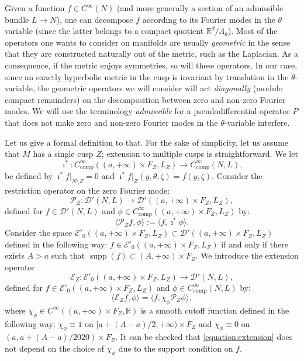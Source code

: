\documentclass[10pt]{amsart}
\newcommand{\R}{\mathbb{R}}
\newcommand{\mc}{\mathcal}
\DeclareMathOperator{\supp}{supp}
\theoremstyle{plain}
\theoremstyle{definition}
\begin{document}
\label{ssection:admissible}

Given a function $f \in C^\infty(N)$ (and more generally a section of an admissible bundle $L \to N$), one can decompose $f$ according to its Fourier modes in the $\theta$ variable (since the latter belongs to a compact quotient $\R^d/\Lambda_\theta$). Most of the operators one wants to consider on manifolds are usually \emph{geometric} in the sense that they are constructed naturally out of the metric, such as the Laplacian. As a consequence, if the metric enjoys symmetries, so will these operators. In our case, since an exactly hyperbolic metric in the cusp is invariant by translation in the $\theta$-variable, the geometric operators we will consider will act \emph{diagonally} (modulo compact remainders) on the decomposition between zero and non-zero Fourier modes. We will use the terminology \emph{admissible} for a pseudodifferential operator $P$ that does not make zero and non-zero Fourier modes in the $\theta$-variable interfere.

Let us give a formal definition to that. For the sake of simplicity, let us assume that $M$ has a single cusp $Z$; extension to multiple cusps is straightforward. We let
\[
\imath^* : C^\infty_{\mathrm{comp}}((a,+\infty) \times F_Z, L_Z) \to C^\infty_{\mathrm{comp}}(N,L),
\]
be defined by $\imath^*f|_{N \setminus Z} = 0$ and $\imath^*f|_{Z}(y,\theta,\zeta) = f(y,\zeta)$. Consider the restriction operator on the zero Fourier mode:
\[
\mc{P}_Z : \mc{D}'(N,L) \to \mc{D}'((a,+\infty) \times F_Z, L_Z),
\]
defined for $f \in \mc{D}'(N,L)$ and $\phi \in C^\infty_{\mathrm{comp}}((a,+\infty) \times F_Z, L_Z)$ by:
\begin{equation}
\label{equation:restriction}
\langle \mc{P}_Z f, \phi \rangle := \langle f, \imath^* \phi \rangle.
\end{equation}
Consider the space $\mc{E}'_0((a,+\infty) \times F_Z, L_Z) \subset \mc{D}'((a,+\infty) \times F_Z, L_Z)$ defined in the following way: $f \in \mc{E}'_0((a,+\infty) \times F_Z, L_Z)$ if and only if there exists $A > a$ such that $\supp(f) \subset (A,+\infty) \times F_Z$. We introduce the extension operator
\[
\mc{E}_Z : \mc{E}'_0((a,+\infty) \times F_Z, L_Z) \to \mc{D}'(N,L),
\]
defined for $f \in \mc{E}'_0((a,+\infty) \times F_Z, L_Z) $ and $\phi \in C^\infty_{\mathrm{comp}}(N,L)$ by:
\begin{equation}
\label{equation:extension}
\langle \mc{E}_Z f, \phi \rangle = \langle f, \chi_\phi \mc{P}_Z \phi \rangle,
\end{equation}
where $\chi_\phi \in C^\infty((a,+\infty) \times F_Z, \R)$ is a smooth cutoff function defined in the following way: $\chi_\phi \equiv 1$ on $[a + (A-a)/2,+\infty) \times F_Z$ and $\chi_\phi \equiv 0$ on $(a,a+(A-a)/2020) \times F_Z$. It can be checked that \eqref{equation:extension} does not depend on the choice of $\chi_\phi$ due to the support condition on $f$.
\end{document}
